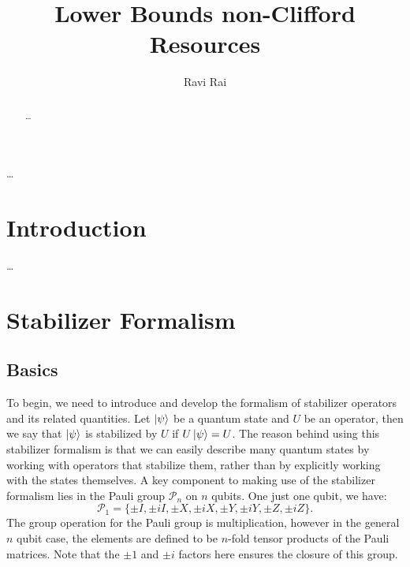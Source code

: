 \documentclass[12pt]{dalthesis}
\begin{document}
\title{Lower Bounds non-Clifford Resources}
\author{Ravi Rai}

\mcs  %




\dedicate{\ldots}

\nolistoftables
\nolistoffigures

\frontmatter

\begin{abstract}
\ldots
\end{abstract}

\begin{acknowledgements}
\ldots
\end{acknowledgements}

\mainmatter

\chapter{Introduction}

\ldots

\chapter{Stabilizer Formalism}
\section{Basics}
To begin, we need to introduce and develop the formalism of stabilizer operators and its related quantities. Let $\ket{\psi}$ be a quantum state and $U$ be an operator, then we say that $\ket{\psi}$ is stabilized by $U$ if $U\ket{\psi} = U$. The reason behind using this stabilizer formalism is that we can easily describe many quantum states by working with operators that stabilize them, rather than by explicitly working with the states themselves. A key component to making use of the stabilizer formalism lies in the Pauli group $\mathcal{P}_n$ on $n$ qubits. One just one qubit, we have:
\begin{equation}
\mathcal{P}_1 = \{ \pm I, \pm iI, \pm X, \pm iX, \pm Y, \pm iY, \pm Z, \pm iZ \}.
\end{equation}
The group operation for the Pauli group is multiplication, however in the general $n$ qubit case, the elements are defined to be $n$-fold tensor products of the Pauli matrices. Note that the $\pm 1$ and $\pm i$ factors here ensures the closure of this group.
\end{document}
